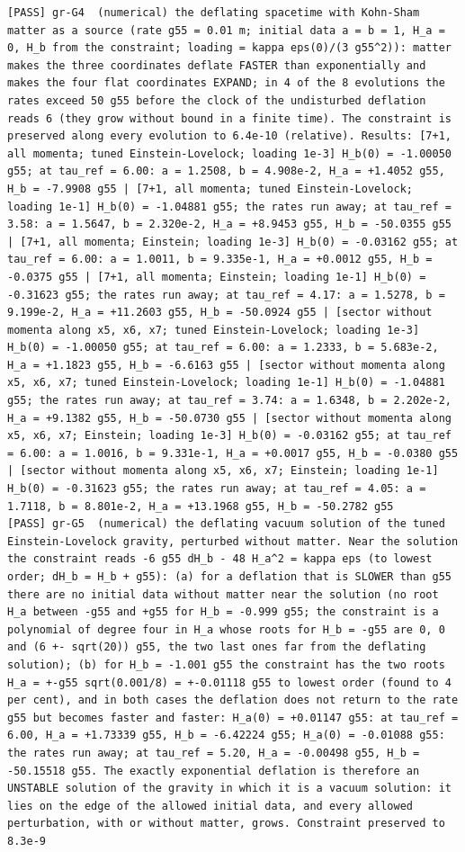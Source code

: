 \documentclass[
  10pt,
]{article}
\begin{document}
\begin{verbatim}
[PASS] gr-G4  (numerical) the deflating spacetime with Kohn-Sham matter as a source (rate g55 = 0.01 m; initial data a = b = 1, H_a = 0, H_b from the constraint; loading = kappa eps(0)/(3 g55^2)): matter makes the three coordinates deflate FASTER than exponentially and makes the four flat coordinates EXPAND; in 4 of the 8 evolutions the rates exceed 50 g55 before the clock of the undisturbed deflation reads 6 (they grow without bound in a finite time). The constraint is preserved along every evolution to 6.4e-10 (relative). Results: [7+1, all momenta; tuned Einstein-Lovelock; loading 1e-3] H_b(0) = -1.00050 g55; at tau_ref = 6.00: a = 1.2508, b = 4.908e-2, H_a = +1.4052 g55, H_b = -7.9908 g55 | [7+1, all momenta; tuned Einstein-Lovelock; loading 1e-1] H_b(0) = -1.04881 g55; the rates run away; at tau_ref = 3.58: a = 1.5647, b = 2.320e-2, H_a = +8.9453 g55, H_b = -50.0355 g55 | [7+1, all momenta; Einstein; loading 1e-3] H_b(0) = -0.03162 g55; at tau_ref = 6.00: a = 1.0011, b = 9.335e-1, H_a = +0.0012 g55, H_b = -0.0375 g55 | [7+1, all momenta; Einstein; loading 1e-1] H_b(0) = -0.31623 g55; the rates run away; at tau_ref = 4.17: a = 1.5278, b = 9.199e-2, H_a = +11.2603 g55, H_b = -50.0924 g55 | [sector without momenta along x5, x6, x7; tuned Einstein-Lovelock; loading 1e-3] H_b(0) = -1.00050 g55; at tau_ref = 6.00: a = 1.2333, b = 5.683e-2, H_a = +1.1823 g55, H_b = -6.6163 g55 | [sector without momenta along x5, x6, x7; tuned Einstein-Lovelock; loading 1e-1] H_b(0) = -1.04881 g55; the rates run away; at tau_ref = 3.74: a = 1.6348, b = 2.202e-2, H_a = +9.1382 g55, H_b = -50.0730 g55 | [sector without momenta along x5, x6, x7; Einstein; loading 1e-3] H_b(0) = -0.03162 g55; at tau_ref = 6.00: a = 1.0016, b = 9.331e-1, H_a = +0.0017 g55, H_b = -0.0380 g55 | [sector without momenta along x5, x6, x7; Einstein; loading 1e-1] H_b(0) = -0.31623 g55; the rates run away; at tau_ref = 4.05: a = 1.7118, b = 8.801e-2, H_a = +13.1968 g55, H_b = -50.2782 g55
[PASS] gr-G5  (numerical) the deflating vacuum solution of the tuned Einstein-Lovelock gravity, perturbed without matter. Near the solution the constraint reads -6 g55 dH_b - 48 H_a^2 = kappa eps (to lowest order; dH_b = H_b + g55): (a) for a deflation that is SLOWER than g55 there are no initial data without matter near the solution (no root H_a between -g55 and +g55 for H_b = -0.999 g55; the constraint is a polynomial of degree four in H_a whose roots for H_b = -g55 are 0, 0 and (6 +- sqrt(20)) g55, the two last ones far from the deflating solution); (b) for H_b = -1.001 g55 the constraint has the two roots H_a = +-g55 sqrt(0.001/8) = +-0.01118 g55 to lowest order (found to 4 per cent), and in both cases the deflation does not return to the rate g55 but becomes faster and faster: H_a(0) = +0.01147 g55: at tau_ref = 6.00, H_a = +1.73339 g55, H_b = -6.42224 g55; H_a(0) = -0.01088 g55: the rates run away; at tau_ref = 5.20, H_a = -0.00498 g55, H_b = -50.15518 g55. The exactly exponential deflation is therefore an UNSTABLE solution of the gravity in which it is a vacuum solution: it lies on the edge of the allowed initial data, and every allowed perturbation, with or without matter, grows. Constraint preserved to 8.3e-9
\end{verbatim}
\end{document}
